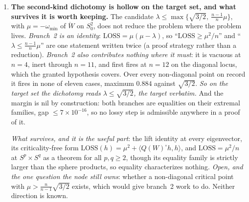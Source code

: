 \begin{enumerate}[leftmargin=1.8em]
\emph{The compactness chain that would convert nondegeneracy into a value bound does not stand as written.} Its positivity step needs $S>0$ at every ungraded critical point of the compact set, and padded $W_{\CP^2}$ is critical at $\theta=\thstar$ \emph{exactly}, at $n=4,8,10,12$, with $S_{\mathfrak{mmm}}=0$. It is a Morse--Bott nondegenerate local maximum there. Two repairs survive and neither turns on the vocabulary: raise the threshold to $\theta_0(n)$, which for $n\ge12$ satisfies $\theta_0(n)^2\ge55/36>3/2$ and so excludes that point strictly; or take graded $:=\{S=0\}$, which makes the step tautological and concentrates the gap into nondegeneracy over $\{S=0\}\cap\{\theta\ge t\}$. \emph{Owed either way}: $S_{\mathfrak{mmm}}$ is discontinuous at an eigenvalue zero-crossing, which the minimum-extraction step needs.

\emph{Falsifier for the target itself}: a non-diagonal $S=0$ critical point above $\thstar$. \textbf{Diagonality is the load-bearing hypothesis and must be carried through}: the $S=0$ class contains the balanced sphere products, running up to $\sqrt2$, and only their diagonality keeps them out.

\item \textbf{The second-kind dichotomy is hollow on the target set, and what survives it is worth keeping.} The candidate $\lambda\le\max\{\sqrt{3/2},\ \tfrac{n-1}n\mu\}$, with $\mu=-\omega_{\min}$ of $\mathring W$ on $S^2_0$, does not reduce the problem where the problem lives. \emph{Branch~2 is an identity}: $\mathrm{LOSS}=\mu(\mu-\lambda)$, so ``$\mathrm{LOSS}\ge\mu^2/n$'' and ``$\lambda\le\tfrac{n-1}n\mu$'' are one statement written twice (a proof strategy rather than a reduction). \emph{Branch~2 also contributes nothing where it must}: it is vacuous at $n=4$, inert through $n=11$, and first fires at $n=12$ on the diagonal locus, which the granted hypothesis covers. Over every non-diagonal point on record it fires in none of eleven cases, maximum $0.884$ against $\sqrt{3/2}$. \emph{So on the target set the dichotomy reads $\lambda\le\sqrt{3/2}$, the target verbatim.} And the margin is nil by construction: both branches are equalities on their extremal families, gap $\le7\times10^{-16}$, so no lossy step is admissible anywhere in a proof of it.

\emph{What survives, and it is the useful part}: the lift identity at every eigenvector, its criticality-free form $\mathrm{LOSS}(h)=\mu^2+\langle Q(W)^{\circ}h,h\rangle$, and $\mathrm{LOSS}=\mu^2/n$ at $S^p\times S^q$ as a theorem for all $p,q\ge2$, though its equality family is strictly larger than the sphere products, so equality characterizes nothing. \emph{Open, and the one question the node still owns}: whether a non-diagonal critical point with $\mu>\tfrac n{n-1}\sqrt{3/2}$ exists, which would give branch~2 work to do. Neither direction is known.


\end{enumerate}
